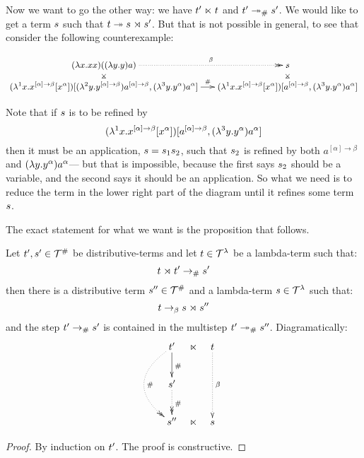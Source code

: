 \bigskip

Now we want to go the other way: we have $t' \mathrel{\ltimes} t$ and $t' \mathrel{\mathrel{\twoheadrightarrow}_{\mathtt{\#}}} s'$.
We would like to get a term $s$ such that $t \mathrel{\twoheadrightarrow} s \mathrel{\rtimes} s'$.
But that is not possible in general, to see that consider the following counterexample:

\[
  {\small
    \xymatrix@R=.25cm@C=.5cm{
      (\lam{\var}{\var \var}) ((\lam{\vartwo}{\vartwo}) a)
      \ar@{.>>}[r]^-{\beta}
      \ar@{}[d]|*=0[@]{\rtimes}
      &
      \tmtwo
      \ar@{}[d]|*=0[@]{\rtimes}
    \\
      (\lamp{1}{\var}{\var^{[\alpha] \to \beta} [\var^{\alpha}]})
          [(\lamp{2}{\vartwo}{\vartwo^{[\alpha] \to \beta}}) a^{[\alpha] \to \beta},
           (\lamp{3}{\vartwo}{\vartwo^\alpha}) a^\alpha]
      \ar@{->}[r]^-{\dist}
      &
      (\lamp{1}{\var}{\var^{[\alpha] \to \beta} [\var^{\alpha}]})
          [a^{[\alpha] \to \beta},
           (\lamp{3}{\vartwo}{\vartwo^\alpha}) a^\alpha]
    }
  }
\]

Note that if $s$ is to be refined by
  \[(\lambda^{1} x. x^{[\alpha] \to \beta} [x^{\alpha}])
          [a^{[\alpha] \to \beta},
           (\lambda^{3} y. y^\alpha) a^\alpha]\]
then it must be an application, $s = s_1 s_2$, such that $s_2$
is refined by both $a^{[\alpha] \to \beta}$ and $(\lambda y. y^\alpha) a^\alpha$---
but that is impossible, because the first says $s_2$ should be a variable, and the second
says it should be an application.
So what we need is to reduce the term in the lower right part of the diagram until
it refines some term $s$.

The exact statement for what we want is the proposition that follows.

\begin{proposition}
Let $t',s' \in \mathcal{T}^{\mathtt{\#}}$ be distributive-terms and let $t \in \mathcal{T}^{\lambda}$ be a lambda-term such that:
\[
  t \mathrel{\rtimes} t' \mathrel{\to_{\mathtt{\#}}} s'
\]
then there is a distributive term $s'' \in \mathcal{T}^{\mathtt{\#}}$ and a lambda-term $s \in \mathcal{T}^{\lambda}$ such that:
\[
  t \mathrel{\to_\beta} s \mathrel{\rtimes} s''
\]
and the step $t' \mathrel{\to_{\mathtt{\#}}} s'$ is contained in the multistep $t' \mathrel{\mathrel{\twoheadrightarrow}_{\mathtt{\#}}} s''$.
Diagramatically:
\[
\xymatrix@C=.25cm{
\tm' \ar[d]^{\dist} \ar@{.>>}@/_1cm/[dd]^{\dist} & \refines  & \tm    \ar@{.>}[dd]^{\beta} \\
\tmtwo' \ar@{.>>}[d]^{\dist}                     &            &                             \\
\tmtwo''                                         & \refines  & \tmtwo                      \\
}
\]
\end{proposition}
\begin{proof}
 By induction on $t'$. The proof is constructive.
\end{proof}

